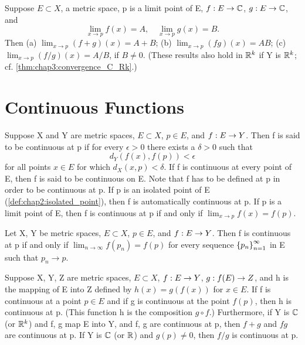 \begin{theorem} %
  \label{thm:chap4:limit_algebra}
  Suppose $E \subset X$, a metric space, p is a limit point of E,
  $f: E \to \mathbb{C}$, $g: E \to \mathbb{C}$, and
  \[ \lim_{x \to p} f(x) = A, \quad \lim_{x \to p} g(x) = B. \]
  Then
  (a) $\lim_{x \to p} (f+g)(x) = A+B$;
  (b) $\lim_{x \to p} (fg)(x) = AB$;
  (c) $\lim_{x \to p} (f/g)(x) = A/B$, if $B \ne 0$.
  (These results also hold in $\mathbb{R}^k$ if Y is $\mathbb{R}^k$; cf.
  \autoref{thm:chap3:convergence_C_Rk}.)
\end{theorem}

\section{Continuous Functions}
\label{sec:chap4:continuous_functions}

\begin{definition}[Continuity] %
  \label{def:chap4:continuity}
  Suppose X and Y are metric spaces, $E \subset X$, $p \in E$, and
  $f: E \to Y$. Then f is said to be continuous at p if for every
  $\epsilon > 0$ there exists a $\delta > 0$ such that
  \[ d_Y(f(x), f(p)) < \epsilon \]
  for all points $x \in E$ for which $d_X(x, p) < \delta$.
  If f is continuous at every point of E, then f is said to be continuous on E.
  Note that f has to be defined at p in order to be continuous at p.
  If p is an isolated point of E
  (\autoref{def:chap2:isolated_point}), then f is automatically
  continuous at p. If p is a limit point of E, then f is continuous
  at p if and only if $\lim_{x \to p} f(x) = f(p)$.
\end{definition}

\begin{theorem} %
  \label{thm:chap4:continuity_via_sequences}
  Let X, Y be metric spaces, $E \subset X$, $p \in E$, and
  $f: E \to Y$. Then f is continuous at p if and only if $\lim_{n
  \to \infty} f(p_n) = f(p)$ for every sequence $\left\{ p_n \right\}_{n=1}^\infty$ in E
  such that $p_n \to p$.
\end{theorem}

\begin{theorem} %
  \label{thm:chap4:continuity_algebra_composition}
  Suppose X, Y, Z are metric spaces, $E \subset X$, $f: E \to Y$,
  $g: f(E) \to Z$, and h is the mapping of E into Z defined by
  $h(x) = g(f(x))$ for $x \in E$. If f is continuous at a point $p
  \in E$ and if g is continuous at the point $f(p)$, then h is
  continuous at p. (This function h is the composition $g \circ f$.)
  Furthermore, if Y is $\mathbb{C}$ (or $\mathbb{R}^k$) and f, g map E into Y, and f,
  g are continuous at p, then $f+g$ and $fg$ are continuous at p. If
  Y is $\mathbb{C}$ (or $\mathbb{R}$) and $g(p) \ne 0$, then $f/g$ is continuous at p.
\end{theorem}

